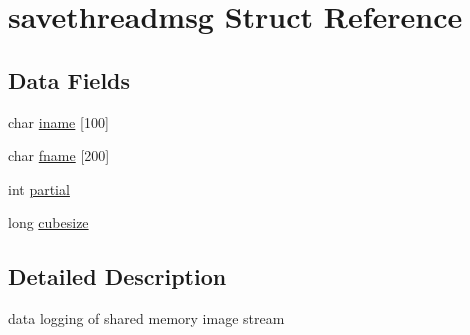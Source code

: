 \hypertarget{structsavethreadmsg}{\section{savethreadmsg Struct Reference}
\label{structsavethreadmsg}
}
\subsection*{Data Fields}
\begin{DoxyCompactItemize}
\item 
char \hyperlink{structsavethreadmsg_a193e6da8b15ce983972c4c79391781a7}{iname} \mbox{[}100\mbox{]}
\item 
char \hyperlink{structsavethreadmsg_af7952ae8c942d61aea68919f599642ad}{fname} \mbox{[}200\mbox{]}
\item 
int \hyperlink{structsavethreadmsg_a67b95feb0e172459de37d4e23fab693b}{partial}
\item 
long \hyperlink{structsavethreadmsg_aabe32dc91c33ab3536ad6d2b6730159f}{cubesize}
\end{DoxyCompactItemize}


\subsection{Detailed Description}
data logging of shared memory image stream 

